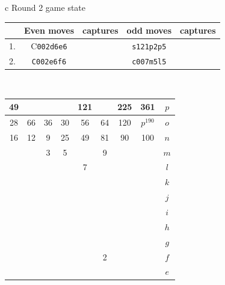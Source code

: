 \documentclass[12pt]{article}
\begin{document}


{\small{
\begin{tabular}{c}
Round 2 game state \\
\begin{tabular}{r|cc|cc}
   & Even moves & captures   & odd moves & captures \\    \hline 
1. & C{\tt 002d6e6}  & \quad & {\tt s121p2p5} & \quad  \\
2. & {\tt C002e6f6} & \quad &  {\tt c007m5l5} & \quad  \\
\end{tabular}
\\
\begin{tabular}{|c|c|c|c|c|c|c|c||c} \hline
\squadfill{\,}49 & \quad & \quad & \quad & \squadfill{\,}121 & \quad & \squadfill{\,}225 & \squadfill{\,}361 & $p$ \\ \hline
\squadfill{\,}28 & \squadfill{\,}66 & \trianglepafill{\,}36 & \trianglepafill{\,}30 & \trianglepafill{\,}56 & \trianglepafill{\,}64 & \squadfill{\,}120 & \rhombusfill{\,}$p^{190}$ & $o$ \\ \hline
\trianglepafill{\,}16 & \trianglepafill{\,}12 & \circletfill{\,}9 & \circletfill{\,}25 & \circletfill{\,}49 & \circletfill{\,}81 & \trianglepafill{\,}90 & \trianglepafill{\,}100 & $n$ \\ \hline
\quad & \quad & \circletfill{\,}3 & \circletfill{\,}5 & \quad & \circletfill{\,}9 & \quad & \quad & $m$ \\ \hline
\quad & \quad & \quad & \quad & \circletfill{\,}7 & \quad & \quad & \quad & $l$ \\ \hline
\quad & \quad & \quad & \quad & \quad & \quad & \quad & \quad & $k$ \\ \hline
\quad & \quad & \quad & \quad & \quad & \quad & \quad & \quad & $j$ \\ \hline
\quad & \quad & \quad & \quad & \quad & \quad & \quad & \quad & $i$ \\ \hline
\quad & \quad & \quad & \quad & \quad & \quad & \quad & \quad & $h$ \\ \hline
\quad & \quad & \quad & \quad & \quad & \quad & \quad & \quad & $g$ \\ \hline
\quad & \quad & \quad & \quad & \quad & \circlet{\,}2 & \quad & \quad & $f$ \\ \hline
\quad & \quad & \quad & \quad & \quad & \quad & \quad & \quad & $e$ \\ \hline

\end{tabular}
\end{tabular}}}
\end{document}
